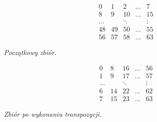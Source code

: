 \documentclass[a4paper]{article}
\theoremstyle{definition}
\begin{document}
\begin{minipage}{.5\textwidth} %

\[
\begin{matrix}
 0 &  1 &  2 &  \ldots & 7 \\
 8 &  9 & 10 &  \ldots & 15 \\
\ldots & & \ddots &  & \vdots \\
48 & 49 & 50 & \ldots & 55 \\
56 & 57 & 58 & \ldots & 63 
\end{matrix}
\]

\begin{center} \it
    Początkowy zbiór.
\end{center}

\end{minipage} %
\begin{minipage}{.5\textwidth} %

\[
\begin{matrix}
 0 &  8 &  16 &  \ldots & 56 \\
 1 &  9 &  17 &  \ldots & 57 \\
\ldots  & & \ddots &     & \vdots \\
 6 & 14 & 22 & \ldots   & 62 \\
 7 & 15 & 23 & \ldots   & 63 
\end{matrix}
\]

\begin{center} \it
    Zbiór po wykonaniu transpozycji.
\end{center}
\end{minipage}

\vspace{0.5em}
\end{document}
